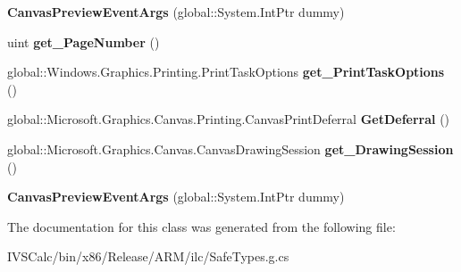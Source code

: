 \begin{DoxyCompactItemize}
{\bfseries Canvas\+Preview\+Event\+Args} (global\+::\+System.\+Int\+Ptr dummy)
\item 
\mbox{\label{class_microsoft_1_1_graphics_1_1_canvas_1_1_printing_1_1_canvas_preview_event_args_ae09b4efa9f3c47599cc48d99dc8f71f2}} 
uint {\bfseries get\+\_\+\+Page\+Number} ()
\item 
\mbox{\label{class_microsoft_1_1_graphics_1_1_canvas_1_1_printing_1_1_canvas_preview_event_args_a62407eb61c4c702e3649d979f1eda285}} 
global\+::\+Windows.\+Graphics.\+Printing.\+Print\+Task\+Options {\bfseries get\+\_\+\+Print\+Task\+Options} ()
\item 
\mbox{\label{class_microsoft_1_1_graphics_1_1_canvas_1_1_printing_1_1_canvas_preview_event_args_a877d99bbaa60578acf4e13109782c656}} 
global\+::\+Microsoft.\+Graphics.\+Canvas.\+Printing.\+Canvas\+Print\+Deferral {\bfseries Get\+Deferral} ()
\item 
\mbox{\label{class_microsoft_1_1_graphics_1_1_canvas_1_1_printing_1_1_canvas_preview_event_args_afa5a185414d95a547b3b8d6de45864d6}} 
global\+::\+Microsoft.\+Graphics.\+Canvas.\+Canvas\+Drawing\+Session {\bfseries get\+\_\+\+Drawing\+Session} ()
\item 
\mbox{\label{class_microsoft_1_1_graphics_1_1_canvas_1_1_printing_1_1_canvas_preview_event_args_adfb508d68950ca5e6aba4bcb1b16375d}} 
{\bfseries Canvas\+Preview\+Event\+Args} (global\+::\+System.\+Int\+Ptr dummy)
\end{DoxyCompactItemize}


The documentation for this class was generated from the following file\+:\begin{DoxyCompactItemize}
\item 
I\+V\+S\+Calc/bin/x86/\+Release/\+A\+R\+M/ilc/Safe\+Types.\+g.\+cs\end{DoxyCompactItemize}
